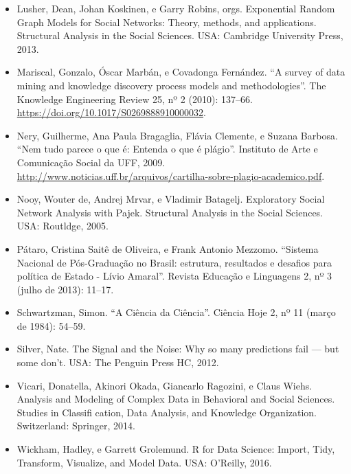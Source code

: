 \documentclass[]{article}
\begin{document}
\begin{itemize}
\item
  Lusher, Dean, Johan Koskinen, e Garry Robins, orgs. Exponential Random
  Graph Models for Social Networks: Theory, methods, and applications.
  Structural Analysis in the Social Sciences. USA: Cambridge University
  Press, 2013.
\item
  Mariscal, Gonzalo, Óscar Marbán, e Covadonga Fernández. ``A survey of
  data mining and knowledge discovery process models and
  methodologies''. The Knowledge Engineering Review 25, nº 2 (2010):
  137--66. \url{https://doi.org/10.1017/S0269888910000032}.
\item
  Nery, Guilherme, Ana Paula Bragaglia, Flávia Clemente, e Suzana
  Barbosa. ``Nem tudo parece o que é: Entenda o que é plágio''.
  Instituto de Arte e Comunicação Social da UFF, 2009.
  \url{http://www.noticias.uff.br/arquivos/cartilha-sobre-plagio-academico.pdf}.
\item
  Nooy, Wouter de, Andrej Mrvar, e Vladimir Batagelj. Exploratory Social
  Network Analysis with Pajek. Structural Analysis in the Social
  Sciences. USA: Routldge, 2005.
\item
  Pátaro, Cristina Saitê de Oliveira, e Frank Antonio Mezzomo. ``Sistema
  Nacional de Pós-Graduação no Brasil: estrutura, resultados e desafios
  para política de Estado - Lívio Amaral''. Revista Educação e
  Linguagens 2, nº 3 (julho de 2013): 11--17.
\item
  Schwartzman, Simon. ``A Ciência da Ciência''. Ciência Hoje 2, nº 11
  (março de 1984): 54--59.
\item
  Silver, Nate. The Signal and the Noise: Why so many predictions fail
  --- but some don't. USA: The Penguin Press HC, 2012.
\item
  Vicari, Donatella, Akinori Okada, Giancarlo Ragozini, e Claus Wiehs.
  Analysis and Modeling of Complex Data in Behavioral and Social
  Sciences. Studies in Classifi cation, Data Analysis, and Knowledge
  Organization. Switzerland: Springer, 2014.
\item
  Wickham, Hadley, e Garrett Grolemund. R for Data Science: Import,
  Tidy, Transform, Visualize, and Model Data. USA: O'Reilly, 2016.
\end{itemize}
\end{document}
